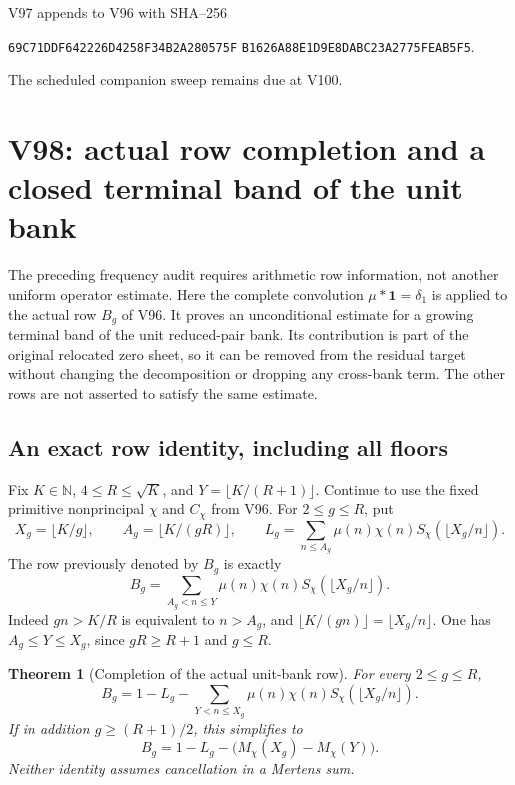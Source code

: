 \documentclass[11pt]{article}
\newtheorem{theorem}{Theorem}[section]
\theoremstyle{definition}
\theoremstyle{remark}
\begin{document}
V97 appends to V96 with SHA--256
\begin{center}
\texttt{69C71DDF642226D4258F34B2A280575F}\allowbreak
\texttt{B1626A88E1D9E8DABC23A2775FEAB5F5}.
\end{center}
The scheduled companion sweep remains due at V100.
\endgroup

\clearpage
\section{V98: actual row completion and a closed terminal band of the unit bank}
\label{sec:f2v98-terminal-unit-bank}
\begingroup
\setcounter{equation}{0}
\renewcommand{\theequation}{N98.\arabic{equation}}
\renewcommand{\theHequation}{f2v98.\arabic{equation}}

The preceding frequency audit requires arithmetic row information, not
another uniform operator estimate.  Here the complete convolution
\(\mu*\mathbf1=\delta_1\) is applied to the actual row \(B_g\) of
V96.  It proves an unconditional estimate for a growing terminal band
of the unit reduced-pair bank.  Its contribution is part of the original
relocated zero sheet, so it can be removed from the residual target
without changing the decomposition or dropping any cross-bank term.
The other rows are not asserted to satisfy the same estimate.

\subsection{An exact row identity, including all floors}

Fix \(K\in\mathbb N\), \(4\le R\le\sqrt K\), and
\(Y=\lfloor K/(R+1)\rfloor\).  Continue to use the fixed primitive
nonprincipal \(\chi\) and \(C_\chi\) from V96.  For \(2\le g\le R\),
put
\begin{equation}
 X_g=\lfloor K/g\rfloor,\qquad A_g=\lfloor K/(gR)\rfloor,
 \qquad
 L_g=\sum_{n\le A_g}\mu(n)\chi(n)S_\chi(\lfloor X_g/n\rfloor).
 \label{eq:f2v98-XAL}
\end{equation}
The row previously denoted by \(B_g\) is exactly
\begin{equation}
 B_g=\sum_{A_g<n\le Y}\mu(n)\chi(n)
                                  S_\chi(\lfloor X_g/n\rfloor).
 \label{eq:f2v98-row}
\end{equation}
Indeed \(gn>K/R\) is equivalent to \(n>A_g\), and
\(\lfloor K/(gn)\rfloor=\lfloor X_g/n\rfloor\).
One has \(A_g\le Y\le X_g\), since \(gR\ge R+1\) and \(g\le R\).

\begin{theorem}[Completion of the actual unit-bank row]
\label{thm:f2v98-row-completion}
For every \(2\le g\le R\),
\begin{equation}
 B_g=1-L_g-
       \sum_{Y<n\le X_g}\mu(n)\chi(n)S_\chi(\lfloor X_g/n\rfloor).
 \label{eq:f2v98-row-completion}
\end{equation}
If in addition \(g\ge(R+1)/2\), this simplifies to
\begin{equation}
 B_g=1-L_g-\bigl(M_\chi(X_g)-M_\chi(Y)\bigr).
 \label{eq:f2v98-short-tail}
\end{equation}
Neither identity assumes cancellation in a Mertens sum.
\end{theorem}
\end{document}

